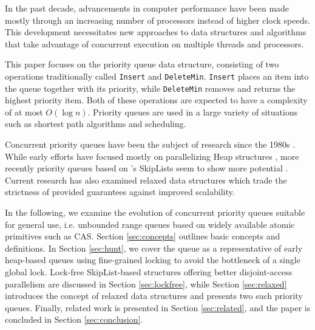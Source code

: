 \documentclass[a4paper,10pt]{article}
\begin{document}

In the past decade, advancements in computer performance have been made mostly
through an increasing number of processors instead of higher clock speeds.
This development necessitates new approaches to data structures and algorithms
that take advantage of concurrent execution on multiple threads and processors. 


This paper focuses on the priority queue data structure, consisting of two operations
traditionally called \lstinline|Insert| and \lstinline|DeleteMin|. \lstinline|Insert|
places an item into the queue together with its priority, while \lstinline|DeleteMin|
removes and returns the highest priority item. Both of these operations are expected to have
a complexity of at most $O(\log n)$. Priority queues are used in a large variety
of situations such as shortest path algorithms and scheduling. %


Concurrent priority queues have been the subject of research since the 1980s
\cite{ayani1990lr,biswas1987simultaneous,das1996distributed,deo1992parallel,huang1991evaluation,
luchetti1993some,mans1998portable,olariu1991optimal,prasad1995parallel}.
While early efforts have focused mostly on parallelizing Heap structures
\cite{hunt1996efficient}, %
more recently priority queues based on \citeauthor{pugh1990skip}'s SkipLists
\cite{pugh1990skip} seem to show more potential \cite{shavit2000skiplist,
sundell2003fast,herlihy2012art,linden2013skiplist}. Current research has also examined
relaxed data structures \cite{wimmer2013data,alistarhspraylist} which trade
the strictness of provided guarantees against improved scalability.


In the following, we examine the evolution of concurrent priority queues suitable for general use,
i.e. unbounded range queues based on widely available atomic primitives such as \ac{CAS}.
Section \ref{sec:concepts} outlines basic concepts and definitions. In Section \ref{sec:hunt},
we cover the \citeauthor{hunt1996efficient} queue as a representative of early heap-based queues using
fine-grained locking to avoid the bottleneck of a single global lock. Lock-free SkipList-based
structures offering better disjoint-access parallelism are discussed in Section \ref{sec:lockfree},
while Section \ref{sec:relaxed} introduces the concept of relaxed data structures and presents two
such priority queues. Finally, related work is presented in Section \ref{sec:related}, and the paper is
concluded in Section \ref{sec:conclusion}.
\end{document}
